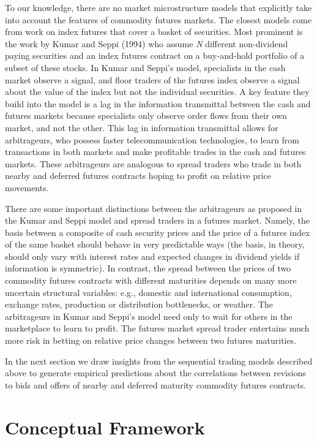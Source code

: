 \documentclass[]{elsarticle} %
\begin{document}
To our knowledge, there are no market microstructure models that
explicitly take into account the features of commodity futures markets.
The closest models come from work on index futures that cover a basket
of securities. Most prominent is the work by Kumar and Seppi (1994) who
assume \emph{N} different non-dividend paying securities and an index
futures contract on a buy-and-hold portfolio of a subset of these
stocks. In Kumar and Seppi's model, specialists in the cash market
observe a signal, and floor traders of the futures index observe a
signal about the value of the index but not the individual securities. A
key feature they build into the model is a lag in the information
transmittal between the cash and futures markets because specialists
only observe order flows from their own market, and not the other. This
lag in information transmittal allows for arbitrageurs, who possess
faster telecommunication technologies, to learn from transactions in
both markets and make profitable trades in the cash and futures markets.
These arbitrageurs are analogous to spread traders who trade in both
nearby and deferred futures contracts hoping to profit on relative price
movements.

There are some important distinctions between the arbitrageurs as
proposed in the Kumar and Seppi model and spread traders in a futures
market. Namely, the basis between a composite of cash security prices
and the price of a futures index of the same basket should behave in
very predictable ways (the basis, in theory, should only vary with
interest rates and expected changes in dividend yields if information is
symmetric). In contrast, the spread between the prices of two commodity
futures contracts with different maturities depends on many more
uncertain structural variables: e.g., domestic and international
consumption, exchange rates, production or distribution bottlenecks, or
weather. The arbitrageurs in Kumar and Seppi's model need only to wait
for others in the marketplace to learn to profit. The futures market
spread trader entertains much more risk in betting on relative price
changes between two futures maturities.

In the next section we draw insights from the sequential trading models
described above to generate empirical predictions about the correlations
between revisions to bids and offers of nearby and deferred maturity
commodity futures contracts.

\section{Conceptual Framework}\label{conceptual-framework}
\end{document}

